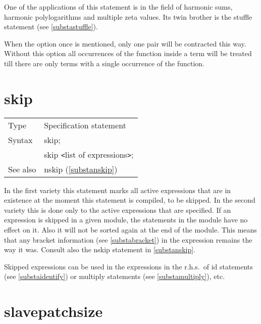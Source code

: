 One of the applications of this statement is in the field of harmonic 
sums, 
harmonic polylogarithms and multiple zeta 
values. Its twin brother is the 
stuffle statement (see \ref{substastuffle}).

When the option once is mentioned, only one pair will be contracted this 
way. Without this option all occurrences of the function inside a term will 
be treated till there are only terms with a single occurrence of the 
function.
\vspace{10mm}
%

\section{skip}
\label{substaskip}

\noindent \begin{tabular}{ll}
Type & Specification statement\\
Syntax & skip; \\
       & skip {\tt<}list of expressions{\tt>};
\\ See also & nskip (\ref{substanskip})
\end{tabular} \vspace{4mm}

\noindent In the first variety this statement marks all 
active expressions that are in existence at the moment this 
statement is compiled, to be skipped. In the second variety this is done 
only to the active expressions that are specified. If an expression is 
skipped in a given module, the statements in the module have no effect on 
it. Also it will not be sorted again at the end of the module. 
This means that any bracket information (see 
\ref{substabracket}) in the expression remains the way it was. Consult also 
the nskip statement in \ref{substanskip}. \vspace{4mm}

\noindent Skipped expressions can be used in the expressions in the r.h.s.\ 
of id statements (see \ref{substaidentify}) or 
multiply statements (see \ref{substamultiply}), etc. 
\vspace{10mm}


\section{slavepatchsize}
\label{substaslavepatchsize}

